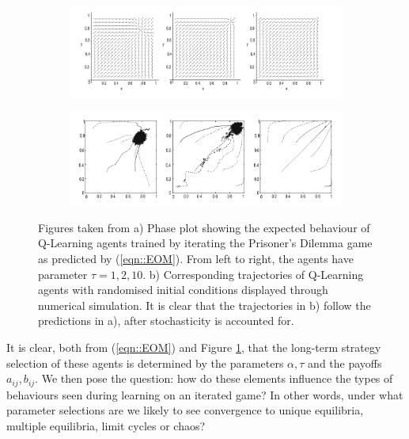 \documentclass[.../main.tex]{subfiles}
\begin{document}
    \begin{figure}[h]
        \centering
        \begin{subfigure}[b]{0.9 \textwidth}
            \centering
            \includegraphics[width=0.75 \textwidth]{Figures/Dynamics}
            \caption{}
        \end{subfigure}
        
        \begin{subfigure}[b]{0.9 \textwidth}
            \centering
            \includegraphics[width=0.7 \textwidth]{Figures/Q-Learners}
            \caption{}
        \end{subfigure}

        \caption{ \label{fig::TuylsExperiments} Figures taken from \cite{Tuyls2006AnGames} a) Phase
        plot showing the expected behaviour of Q-Learning agents trained by iterating the
        Prisoner's Dilemma game as predicted by (\ref{eqn::EOM}). From left to right, the agents
        have parameter $\tau = 1, 2, 10$. b) Corresponding trajectories of Q-Learning agents with
        randomised initial conditions displayed through numerical simulation. It is clear that the
        trajectories in b) follow the predictions in a), after stochasticity is accounted for. }
    \end{figure}    

    It is clear, both from (\ref{eqn::EOM}) and Figure \ref{fig::TuylsExperiments}, that the long-term strategy selection of
    these agents is determined by the parameters $\alpha, \tau$ and the payoffs $a_{ij}, b_{ij}$. We
    then pose the question: how do these elements influence the types of behaviours seen during
    learning on an iterated game? In other words, under what parameter selections are we likely to
    see convergence to unique equilibria, multiple equilibria, limit cycles or chaos?
\end{document}
